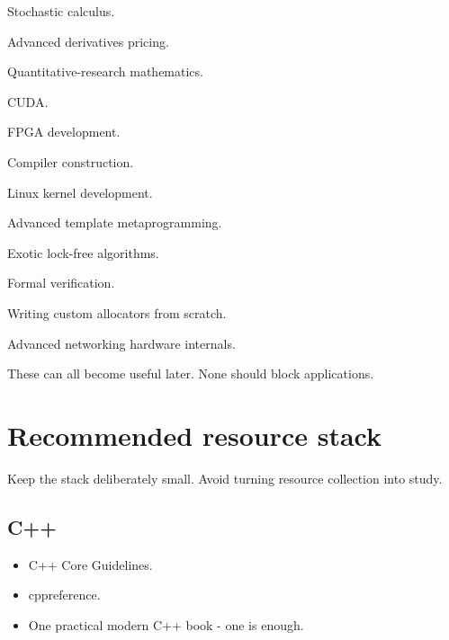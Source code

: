 \documentclass[11pt,letterpaper]{article}
\begin{document}
\begin{topics}

\item Stochastic calculus.

\item Advanced derivatives pricing.

\item Quantitative-research mathematics.

\item CUDA.

\item FPGA development.

\item Compiler construction.

\item Linux kernel development.

\item Advanced template metaprogramming.

\item Exotic lock-free algorithms.

\item Formal verification.

\item Writing custom allocators from scratch.

\item Advanced networking hardware internals.

\end{topics}

These can all become useful later. None should block applications.

\clearpage
\section{Recommended resource stack}\label{sec:18}

Keep the stack deliberately small. Avoid turning resource collection into study.

\subsection*{C++}

\begin{itemize}

\item C++ Core Guidelines.

\item cppreference.

\item One practical modern C++ book - one is enough.

\end{itemize}
\end{document}
